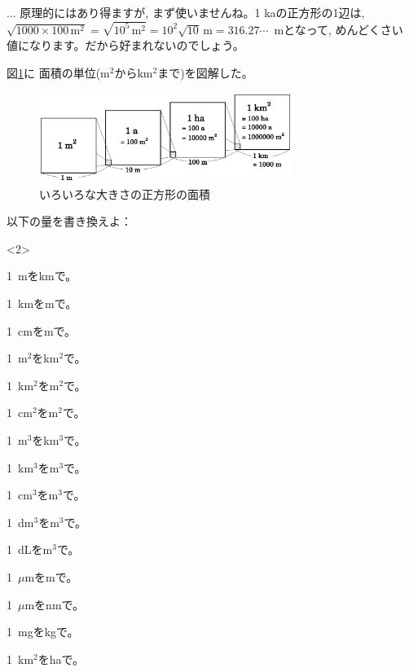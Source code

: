 \begin{faq}{\small{}... 原理的にはあり得ますが, 
まず使いませんね。1 kaの正方形の1辺は, 
$\sqrt{1000\times100\,\text{m}^2}=\sqrt{10^5\,\text{m}^2}
=10^2\sqrt{10}\,\text{m}=316.27\cdots$~mとなって, めんどくさい
値になります。だから好まれないのでしょう。}\end{faq}

図\ref{fig:area_km2_ha}に
面積の単位(m$^2$からkm$^2$まで)を図解した。

\begin{figure}[h]
    \centering
    \includegraphics[width=8.2cm]{area_km2_ha.eps}
    \caption{いろいろな大きさの正方形の面積}\label{fig:area_km2_ha}
\end{figure}

\begin{q}\label{q:alg_unit1} 以下の量を書き換えよ：
\begin{edaenumerate}<2>
\item 1~mをkmで。
\item 1~kmをmで。
\item 1~cmをmで。

\item 1~m$^2$をkm$^2$で。
\item 1~km$^2$をm$^2$で。
\item 1~cm$^2$をm$^2$で。

\item 1~m$^3$をkm$^3$で。
\item 1~km$^3$をm$^3$で。
\item 1~cm$^3$をm$^3$で。

\item 1~dm$^3$をm$^3$で。
\item 1~dLをm$^3$で。
\item 1~$\mu$mをmで。

\item 1~$\mu$mをnmで。
\item 1~mgをkgで。
\item 1~km$^2$をhaで。
\end{edaenumerate}
\end{q}

